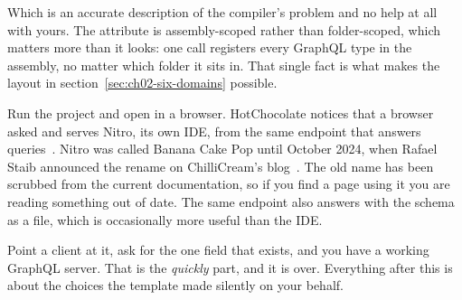 Which is an accurate description of the compiler's problem and no help at all
with yours. The attribute is assembly-scoped rather than folder-scoped, which
matters more than it looks: one  call registers every
GraphQL type in the assembly, no matter which folder it sits in. That single
fact is what makes the layout in section~\ref{sec:ch02-six-domains} possible.

%
Run the project and open  in a browser.
HotChocolate notices that a browser asked and serves Nitro, its own IDE, from
the same endpoint that answers queries~\autocite{chillicream2026endpoints}.
Nitro was called Banana Cake Pop until October 2024, when Rafael Staib announced
the rename on ChilliCream's blog~\autocite{staib2024nitro}. The old name has been
scrubbed from the current documentation, so if you find a page using it you are
reading something out of date. The same endpoint also answers  with
the schema as a file, which is occasionally more useful than the IDE.

Point a client at it, ask for the one field that exists, and you have a working
GraphQL server. That is the \emph{quickly} part, and it is over. Everything
after this is about the choices the template made silently on your behalf.
